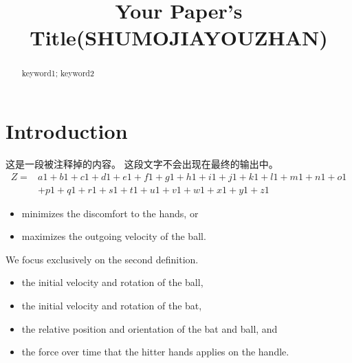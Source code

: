 \documentclass{mcmthesis}
\title{Your Paper's Title(SHUMOJIAYOUZHAN)}
\begin{document}
\begin{abstract}
\lipsum[1]
\cite{nosek2002math}


\begin{keywords}
keyword1; keyword2
\end{keywords}
\end{abstract}
\maketitle
 \tableofcontents
 \newpage



\section{Introduction}
\iffalse
这是一段被注释掉的内容。
这段文字不会出现在最终的输出中。
\begin{equation}
  \begin{split}
    Z=&a1+b1+c1+d1+e1+f1+g1+h1+i1+j1+k1+l1+m1+n1+o1\\
    &+p1+q1+r1+s1+t1+u1+v1+w1+x1+y1+z1
  \end{split}
\end{equation}
\lipsum[2]
\begin{itemize}
\item minimizes the discomfort to the hands, or 
\item maximizes the outgoing velocity of the ball.
\end{itemize}
We focus exclusively on the second definition.
\begin{itemize}
\item the initial velocity and rotation of the ball,
\item the initial velocity and rotation of the bat,
\item the relative position and orientation of the bat and ball, and
\item the force over time that the hitter hands applies on the handle.
\end{itemize}
\end{document}
